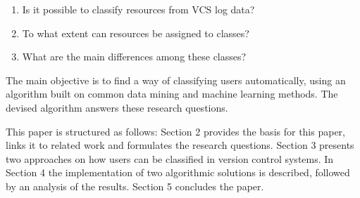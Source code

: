 \begin{enumerate}

\item Is it possible to classify resources from VCS log data?

\item To what extent can resources be assigned to classes?

\item What are the main differences among these classes?

\end{enumerate}


The main objective is to find a way of classifying users automatically, using an algorithm built on common data mining and machine learning methods. The devised algorithm answers these research questions.


This paper is structured as follows: Section 2 provides the basis for this paper, links it to related work and formulates the research questions. Section 3 presents two approaches on how users can be classified in version control systems. In Section 4 the implementation of two algorithmic solutions is described, followed by an analysis of the results. Section 5 concludes the paper.

